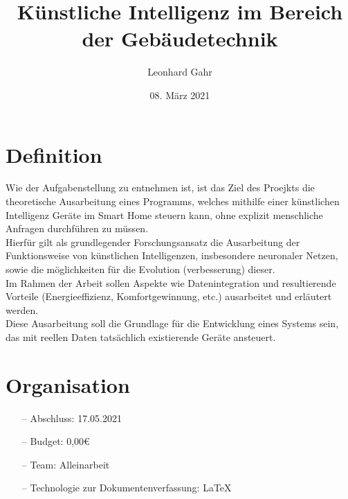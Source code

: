 \documentclass[
	ngerman,
	12pt, %
]{pm}
\title{Künstliche Intelligenz im Bereich der Gebäudetechnik}
\author{Leonhard Gahr} %
\date{08. März 2021} %
\institute{\texttt{[image: ../img/sie-logo.png]}\hfill\texttt{[image: ../img/dhbw-logo]}} %
\begin{document}
\maketitle %


\section*{\large Definition}
Wie der Aufgabenstellung zu entnehmen ist, ist das Ziel des Proejkts die theoretische Ausarbeitung eines Programms, welches mithilfe einer künstlichen Intelligenz Geräte im Smart Home steuern kann, ohne explizit menschliche Anfragen durchführen zu müssen.\\
Hierfür gilt als grundlegender Forschungsansatz die Ausarbeitung der Funktionsweise von künstlichen Intelligenzen, insbesondere neuronaler Netzen, sowie die möglichkeiten für die Evolution (verbesserung) dieser.\\
Im Rahmen der Arbeit sollen Aspekte wie Datenintegration und resultierende Vorteile (Energieeffizienz, Komfortgewinnung, etc.) ausarbeitet und erläutert werden.\\ 
Diese Ausarbeitung soll die Grundlage für die Entwicklung eines Systems sein, das mit reellen Daten tatsächlich existierende Geräte ansteuert.

\section*{\large Organisation}
\begin{enumerate}
	\item [--] Abschluss: 17.05.2021
	\item [--] Budget: 0,00€
	\item [--] Team: Alleinarbeit
	\item [--] Technologie zur Dokumentenverfassung: \LaTeX
\end{enumerate}
\end{document}
